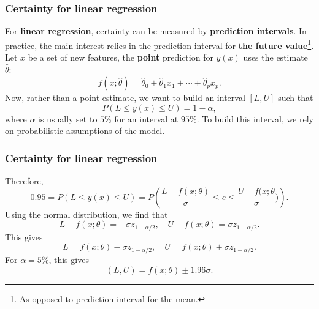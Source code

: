 \begin{frame}
\frametitle{Certainty for linear regression}
For {\bf linear regression}, certainty can be measured by {\bf prediction intervals}. In practice, the main interest relies in the prediction interval for {\bf the future value}\footnote{As opposed to prediction interval for the mean.}. \\
\vspace{0.3cm}
Let $x$ be a set of new features, the {\bf point} prediction for $y(x)$ uses the estimate $\hat{\theta}$:
$$
f(x;\hat{\theta}) = \hat{\theta}_0 + \hat{\theta}_1 x_1 + \cdots + \hat{\theta}_p x_p.
$$
Now, rather than a point estimate, we want to build an interval $[L,U]$ such that 
$$
P(L \leq y(x) \leq U) = 1-\alpha,
$$
where $\alpha$ is usually set to $5\%$ for an interval at $95\%$. To build this interval, we rely on probabilistic assumptions of the model.
\end{frame}
\begin{frame}
\frametitle{Certainty for linear regression}
Therefore,
$$
0.95 = P(L \leq y(x) \leq U) = P\left(\frac{L-f(x;\theta)}{\sigma} \leq e \leq \frac{U-f(x;\theta}{\sigma})\right).
$$
Using the normal distribution, we find that
$$
L-f(x;\theta) = -\sigma z_{1-\alpha/2}, \quad U-f(x;\theta) = \sigma z_{1-\alpha/2}.
$$
This gives 
$$
L = f(x;\theta) -\sigma z_{1-\alpha/2}, \quad U = f(x;\theta) + \sigma z_{1-\alpha/2}.
$$
For $\alpha=5\%$, this gives
$$
(L,U) = f(x;\theta) \pm 1.96 \sigma.
$$
\end{frame}
